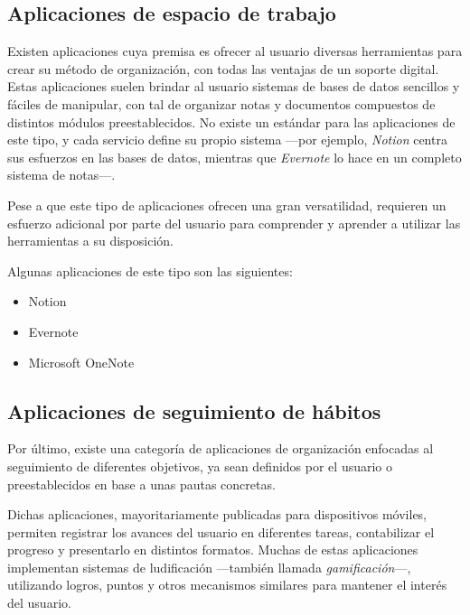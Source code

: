 \documentclass[10pt, a4paper]{aqademic}
\begin{document}
\subsection*{Aplicaciones de espacio de trabajo}

Existen aplicaciones cuya premisa es ofrecer al usuario diversas herramientas para crear su método de organización, con todas las ventajas de un soporte digital. Estas aplicaciones suelen brindar al usuario sistemas de bases de datos sencillos y fáciles de manipular, con tal de organizar notas y documentos compuestos de distintos módulos preestablecidos. No existe un estándar para las aplicaciones de este tipo, y cada servicio define su propio sistema ---por ejemplo, \textit{Notion} centra sus esfuerzos en las bases de datos, mientras que \textit{Evernote} lo hace en un completo sistema de notas---.

\medskip

Pese a que este tipo de aplicaciones ofrecen una gran versatilidad, requieren un esfuerzo adicional por parte del usuario para comprender y aprender a utilizar las herramientas a su disposición. 

\medskip

Algunas aplicaciones de este tipo son las siguientes:

\begin{itemize}
	\item Notion
	\item Evernote
	\item Microsoft OneNote
\end{itemize}

\subsection*{Aplicaciones de seguimiento de hábitos}

Por último, existe una categoría de aplicaciones de organización enfocadas al seguimiento de diferentes objetivos, ya sean definidos por el usuario o preestablecidos en base a unas pautas concretas. 

\medskip

Dichas aplicaciones, mayoritariamente publicadas para dispositivos móviles, permiten registrar los avances del usuario en diferentes tareas, contabilizar el progreso y presentarlo en distintos formatos. Muchas de estas aplicaciones implementan sistemas de ludificación \cite{inproceedings} ---también llamada \textit{gamificación}---, utilizando logros, puntos y otros mecanismos similares para mantener el interés del usuario.
\end{document}
